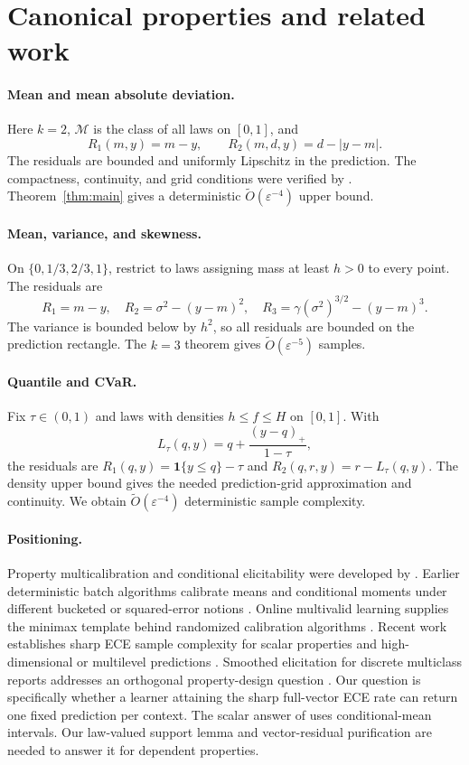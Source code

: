 \documentclass{article}
\theoremstyle{definition}
\theoremstyle{remark}
\newcommand{\1}{\mathbf 1}
\newcommand{\cM}{\mathcal M}
\begin{document}
\section{Canonical properties and related work}

\paragraph{Mean and mean absolute deviation.} Here $k=2$, $\cM$ is the class of all laws on $[0,1]$, and
\[ R_1(m,y)=m-y,\qquad R_2(m,d,y)=d-|y-m|. \] The residuals are bounded and uniformly Lipschitz in the prediction. The compactness, continuity, and grid conditions were verified by \citet{lu2026multilevel}. Theorem~\ref{thm:main} gives a deterministic $\widetilde O(\varepsilon^{-4})$ upper bound.

\paragraph{Mean, variance, and skewness.} On $\{0,1/3,2/3,1\}$, restrict to laws assigning mass at least $h>0$ to every point. The residuals are
\[ R_1=m-y,\quad R_2=\sigma^2-(y-m)^2,\quad R_3=\gamma(\sigma^2)^{3/2}-(y-m)^3. \] The variance is bounded below by $h^2$, so all residuals are bounded on the prediction rectangle. The $k=3$ theorem gives $\widetilde O(\varepsilon^{-5})$ samples.

\paragraph{Quantile and CVaR.} Fix $\tau\in(0,1)$ and laws with densities $h\le f\le H$ on $[0,1]$. With
\[ L_\tau(q,y)=q+\frac{(y-q)_+}{1-\tau}, \] the residuals are $R_1(q,y)=\1\{y\le q\}-\tau$ and $R_2(q,r,y)=r-L_\tau(q,y)$. The density upper bound gives the needed prediction-grid approximation and continuity. We obtain $\widetilde O(\varepsilon^{-4})$ deterministic sample complexity.

\paragraph{Positioning.} Property multicalibration and conditional elicitability were developed by \citet{noarovroth2023scope}. Earlier deterministic batch algorithms calibrate means and conditional moments under different bucketed or squared-error notions \citep{jung2021moment}. Online multivalid learning supplies the minimax template behind randomized calibration algorithms \citep{gupta2022online}. Recent work establishes sharp ECE sample complexity for scalar properties \citep{collina2026sample} and high-dimensional or multilevel predictions \citep{noarov2025highdim,lu2026multilevel}. Smoothed elicitation for discrete multiclass reports addresses an orthogonal property-design question \citep{finocchiaro2026smoothed}. Our question is specifically whether a learner attaining the sharp full-vector ECE rate can return one fixed prediction per context. The scalar answer of \citet{noarovroth2026deterministic} uses conditional-mean intervals. Our law-valued support lemma and vector-residual purification are needed to answer it for dependent properties.
\end{document}
